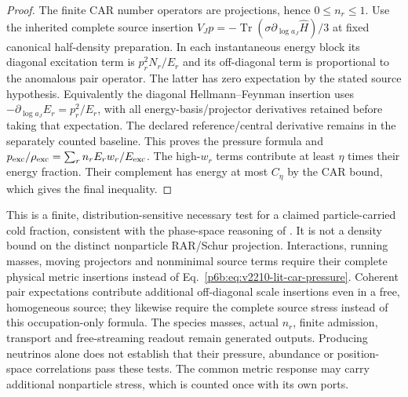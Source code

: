 \documentclass[12pt,a4paper]{article}
\begin{document}
\begin{proof}
The finite CAR number operators are projections, hence $0\le n_r\le1$.
Use the inherited complete source insertion
$V_Jp=-\operatorname{Tr}(\sigma\partial_{\log a_J}\widehat H)/3$
at fixed canonical half-density preparation. In each instantaneous energy
block its diagonal excitation term is $p_r^2N_r/E_r$ and its off-diagonal
term is proportional to the anomalous pair operator. The latter has zero
expectation by the stated source hypothesis. Equivalently the diagonal
Hellmann--Feynman insertion uses
$-\partial_{\log a_J}E_r=p_r^2/E_r$, with all energy-basis/projector
derivatives retained before taking that expectation. The declared
reference/central derivative remains in the separately counted baseline.
This proves the pressure formula and
$p_{\rm exc}/\rho_{\rm exc}=\sum_rn_rE_rw_r/E_{\rm exc}$.
The high-$w_r$ terms contribute at least $\eta$ times their energy
fraction. Their complement has energy at most $C_\eta$ by the CAR bound,
which gives the final inequality.
\end{proof}
This is a finite, distribution-sensitive necessary test for a claimed
particle-carried cold fraction, consistent with the phase-space reasoning
of \cite{LitCOSTremaineGunn1979}. It is not a density bound on the distinct
nonparticle RAR/Schur projection. Interactions, running masses, moving
projectors and nonminimal source terms require their complete physical
metric insertions instead of Eq.~\eqref{p6b:eq:v2210-lit-car-pressure}.
Coherent pair expectations contribute additional off-diagonal scale
insertions even in a free, homogeneous source; they likewise require the
complete source stress instead of this occupation-only formula.
The species masses, actual $n_r$, finite admission, transport and
free-streaming readout remain generated outputs. Producing neutrinos alone
does not establish that their pressure, abundance or position-space
correlations pass these tests. The common metric response may carry
additional nonparticle stress, which is counted once with its own ports.

\end{document}
